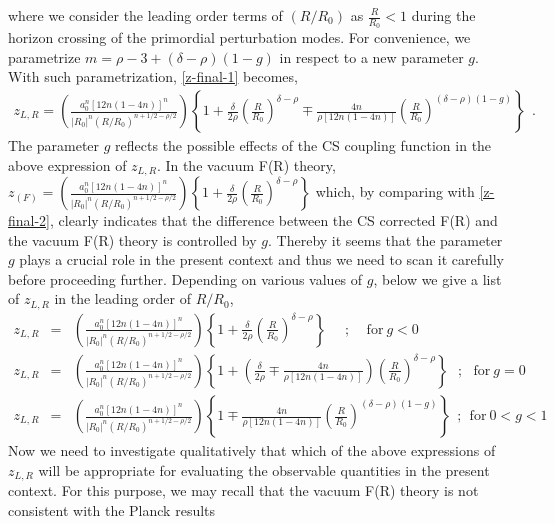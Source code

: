 \documentclass{article}
\begin{document}
where we consider the leading order terms of $\left(R/R_0\right)$ as $\frac{R}{R_0} < 1$ during the horizon crossing of the primordial 
perturbation modes. For convenience, we parametrize $m = \rho - 3 + (\delta-\rho)(1-g)$ in respect to a new parameter $g$. With such parametrization, 
\ref{z-final-1} becomes,
\begin{eqnarray}
 z_{L,R} = \left(\frac{a_0^n\left[12n(1-4n)\right]^n}{\left|R_0\right|^n\left(R/R_0\right)^{n+1/2-\rho/2}}\right)
 \left\{1 + \frac{\delta}{2\rho}\left(\frac{R}{R_0}\right)^{\delta - \rho} 
 \mp \frac{4n}{\rho\left[12n(1-4n)\right]}\left(\frac{R}{R_0}\right)^{(\delta-\rho)(1-g)}\right\}~~.
 \label{z-final-2}
\end{eqnarray}
The parameter $g$ reflects the possible effects of the CS coupling function in the above expression of $z_{L,R}$. In the vacuum F(R) theory, 
$z_{(F)} = \left(\frac{a_0^n\left[12n(1-4n)\right]^n}{\left|R_0\right|^n\left(R/R_0\right)^{n+1/2-\rho/2}}\right)
 \left\{1 + \frac{\delta}{2\rho}\left(\frac{R}{R_0}\right)^{\delta - \rho}\right\}$ which, by comparing with 
 \ref{z-final-2}, clearly indicates that the difference between the CS corrected F(R) and the vacuum F(R) theory is controlled by $g$. Thereby 
 it seems that the parameter $g$ plays a crucial role in the present context and thus we need to scan it carefully before proceeding further. 
 Depending on various values of $g$, below we give a list of $z_{L,R}$ in the leading order of $R/R_0$,
 \begin{eqnarray}
  z_{L,R}&=&\left(\frac{a_0^n\left[12n(1-4n)\right]^n}{\left|R_0\right|^n\left(R/R_0\right)^{n+1/2-\rho/2}}\right)
 \left\{1 + \frac{\delta}{2\rho}\left(\frac{R}{R_0}\right)^{\delta - \rho}\right\}~~~~~~;~~~~~\mathrm{for}~g < 0\label{1}\\
 z_{L,R}&=&\left(\frac{a_0^n\left[12n(1-4n)\right]^n}{\left|R_0\right|^n\left(R/R_0\right)^{n+1/2-\rho/2}}\right)
 \left\{1 + \left(\frac{\delta}{2\rho} \mp \frac{4n}{\rho\left[12n(1-4n)\right]}\right)\left(\frac{R}{R_0}\right)^{\delta - \rho}\right\}
 ~~~;~~~\mathrm{for}~g = 0\label{2}\\
 z_{L,R}&=&\left(\frac{a_0^n\left[12n(1-4n)\right]^n}{\left|R_0\right|^n\left(R/R_0\right)^{n+1/2-\rho/2}}\right)
 \left\{1 \mp \frac{4n}{\rho\left[12n(1-4n)\right]}\left(\frac{R}{R_0}\right)^{(\delta-\rho)(1-g)}\right\}~~;~~\mathrm{for}~0 < g < 1\label{3}
 \end{eqnarray}
 Now we need to investigate qualitatively that which of the above expressions of $z_{L,R}$ will be appropriate for evaluating 
 the observable quantities in the present context. For this purpose, we may recall that the vacuum F(R) theory is not consistent with the Planck results 
\end{document}
